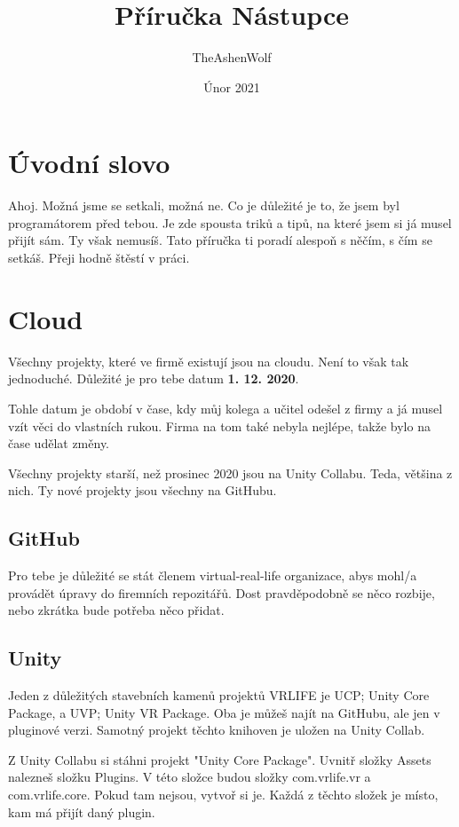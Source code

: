 \documentclass{article}
\title{Příručka Nástupce}
\author{TheAshenWolf}
\date{Únor 2021}
\begin{document}
\maketitle

\pagebreak

\renewcommand{\contentsname}{Obsah}
\tableofcontents

\pagebreak

\section{Úvodní slovo}
Ahoj. Možná jsme se setkali, možná ne. Co je důležité je to, že jsem byl programátorem před tebou. Je zde spousta triků a tipů, na které jsem si já musel přijít sám. Ty však nemusíš. Tato příručka ti poradí alespoň s něčím, s čím se setkáš. Přeji hodně štěstí v práci.
\pagebreak

\section{Cloud}
Všechny projekty, které ve firmě existují jsou na cloudu. Není to však tak jednoduché. Důležité je pro tebe datum \textbf{1. 12. 2020}. 

Tohle datum je období v čase, kdy můj kolega a učitel odešel z firmy a já musel vzít věci do vlastních rukou. Firma na tom také nebyla nejlépe, takže bylo na čase udělat změny.

Všechny projekty starší, než prosinec 2020 jsou na Unity Collabu. Teda, většina z nich. Ty nové projekty jsou všechny na GitHubu. 

\subsection{GitHub}
Pro tebe je důležité se stát členem virtual-real-life organizace, abys mohl/a provádět úpravy do firemních repozitářů. Dost pravděpodobně se něco rozbije, nebo zkrátka bude potřeba něco přidat.

\subsection{Unity}
Jeden z důležitých stavebních kamenů projektů VRLIFE je UCP; Unity Core Package, a UVP; Unity VR Package. Oba je můžeš najít na GitHubu, ale jen v pluginové verzi. Samotný projekt těchto knihoven je uložen na Unity Collab.

Z Unity Collabu si stáhni projekt "Unity Core Package". Uvnitř složky Assets nalezneš složku Plugins. V této složce budou složky com.vrlife.vr a com.vrlife.core. Pokud tam nejsou, vytvoř si je. Každá z těchto složek je místo, kam má přijít daný plugin.
\end{document}
